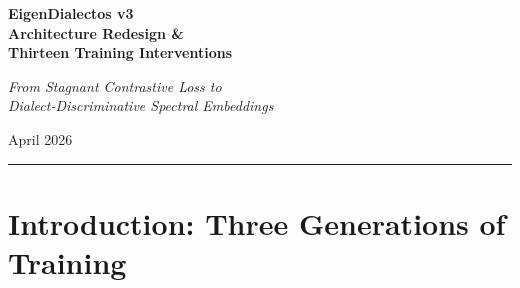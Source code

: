 \documentclass[11pt,a4paper]{article}
\newcommand{\loss}{\mathcal{L}}
\begin{document}
\begin{titlepage}
\centering
\vspace*{2cm}
{\Huge\bfseries\color{blue!70!black} EigenDialectos v3\\[0.3cm]
\Large Architecture Redesign \&\\[0.2cm]
Thirteen Training Interventions}

\vspace{1.5cm}
{\large\textit{From Stagnant Contrastive Loss to\\
Dialect-Discriminative Spectral Embeddings}}

\vspace{2cm}
{\large April 2026}

\vspace{1cm}
\rule{0.6\textwidth}{0.5pt}

\vspace{1cm}
\begin{abstract}
\noindent
The EigenDialectos v2 training architecture, while correcting the fundamental
gradient reversal contradiction of v1, exhibited persistent contrastive loss
stagnation at $\loss_{\text{con}} \approx 7.9$ --- near the theoretical XBM
ceiling of $\ln(3612) \approx 8.19$ --- even after 23 hours of training. A
systematic root-cause analysis identified five interacting failure modes:
gradient budget starvation ($w_{\text{con}} = 0.2$), excessive warmup (entire
first epoch), premature XBM exposure, LayerNorm variance suppression in the
projection head, and GELU dead-zone gradient attenuation. This report details
thirteen architectural and optimization interventions designed to address
every identified failure mode simultaneously. The v3 system introduces a
two-phase training protocol, ArcFace angular margin classification,
PCA-initialized 2-layer MLP+BatchNorm projection, center loss warmup,
separate learning rates, and gradual XBM ramping. Early v3 results (first
2{,}000 optimizer steps) show MLM learning 8\% faster than v2, with the
ArcFace classifier rapidly establishing angular dialect separation in the
768-dimensional pooled space --- the prerequisite for contrastive descent
when SupCon activates at epoch~3.
\end{abstract}
\end{titlepage}

\tableofcontents
\newpage

\section{Introduction: Three Generations of Training}
\end{document}
